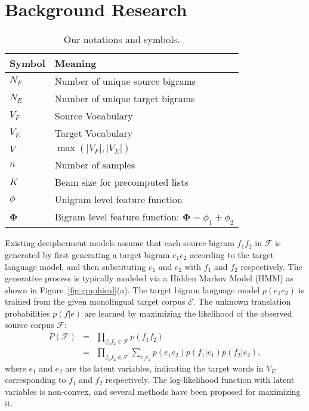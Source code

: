 \section{Background Research}
\begin{table}
\footnotesize
\centering
\begin{tabular}{ | l | l | }
  \hline 
         {Symbol}  & { Meaning} \\  \hline  \hline
        $N_F$  & Number of unique source bigrams \\ \hline
        $N_E$  & Number of unique target bigrams \\ \hline
        	$V_F$ &   Source Vocabulary     \\ \hline 
	$V_E$  &   Target Vocabulary    \\ \hline 
        $V$  & $\max(|V_F|,|V_E|)$  \\ \hline
        $n$ & Number of samples \\ \hline
        $K$ & Beam size for precomputed lists \\ \hline
        $\phi$ & Unigram level feature function \\ \hline
        $\mathbf{\Phi}$  & Bigram level feature function: $\mathbf{\Phi} = \phi_1 + \phi_2$ \\ \hline
\end{tabular}
\caption{Our notations and symbols.}
\label{table:notation}
\end{table}
Existing decipherment models assume that each source bigram $f_1 f_2$ in $\mathcal{F}$ is generated by first generating a target bigram $e_1 e_2$ according to the target language model, and then substituting $e_1$ and $e_2$ with $f_1$ and $f_2$ respectively. 
The generative process is typically modeled via a Hidden Markov Model (HMM) as shown in Figure~\ref{fig:graphical}(a).
The target bigram language model $p(e_1 e_2)$ is trained from the given monolingual target corpus $\mathcal{E}$. 
The unknown translation probabilities $p(f|e)$ are learned by maximizing the likelihood of the observed source corpus $\mathcal{F}$:
\begin{eqnarray}
P(\mathcal{F} ) &=& \prod_{f_1 f_2 \in \mathcal{F}} p(f_1 f_2)  \\ 
  &=& \prod_{f_1f_2 \in \mathcal{F}} \sum_{e_1e_2} p(e_1 e_2) p(f_1|e_1) p(f_2|e_2), \nonumber
\end{eqnarray}
where $e_1$ and $e_2$ are the latent variables, indicating the target words in $V_E$ corresponding to $f_1$ and $f_2$ respectively.
The log-likelihood function with latent variables is non-convex, and several methods have been proposed for maximizing it. 
